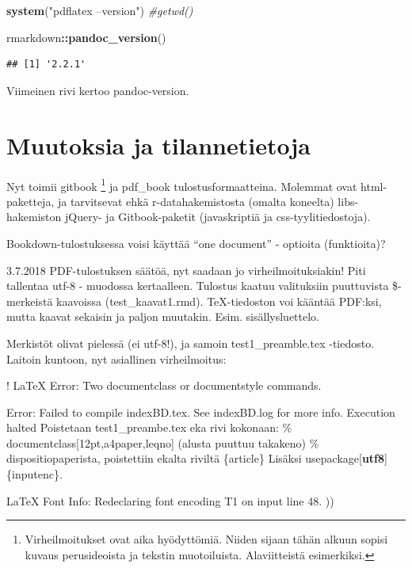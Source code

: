 \documentclass[finnish,]{book}
\newenvironment{Shaded}{\begin{snugshade}}{\end{snugshade}}
\newcommand{\CommentTok}[1]{\textcolor[rgb]{0.56,0.35,0.01}{\textit{#1}}}
\newcommand{\KeywordTok}[1]{\textcolor[rgb]{0.13,0.29,0.53}{\textbf{#1}}}
\newcommand{\NormalTok}[1]{#1}
\newcommand{\OperatorTok}[1]{\textcolor[rgb]{0.81,0.36,0.00}{\textbf{#1}}}
\newcommand{\StringTok}[1]{\textcolor[rgb]{0.31,0.60,0.02}{#1}}
\let\rmarkdownfootnote\footnote%
\def\footnote{\protect\rmarkdownfootnote}
\theoremstyle{definition}
\theoremstyle{definition}
\theoremstyle{definition}
\theoremstyle{remark}
\begin{document}
\begin{Shaded}
\begin{Highlighting}[]
\KeywordTok{system}\NormalTok{(}\StringTok{"pdflatex --version"}\NormalTok{)}
\CommentTok{#getwd()}

\NormalTok{rmarkdown}\OperatorTok{::}\KeywordTok{pandoc_version}\NormalTok{()}
\end{Highlighting}
\end{Shaded}

\begin{verbatim}
## [1] '2.2.1'
\end{verbatim}

Viimeinen rivi kertoo pandoc-version.

\hypertarget{muutoksia-ja-tilannetietoja}{%
\section{Muutoksia ja
tilannetietoja}\label{muutoksia-ja-tilannetietoja}}

Nyt toimii gitbook \footnote{Virheilmoitukset ovat aika hyödyttömiä.
  Niiden sijaan tähän alkuun sopisi kuvaus perusideoista ja tekstin
  muotoiluista. Alaviitteistä esimerkiksi.} ja pdf\_book
tulostusformaatteina. Molemmat ovat html-paketteja, ja tarvitsevat ehkä
r-datahakemistosta (omalta koneelta) libs-hakemiston jQuery- ja
Gitbook-paketit (javaskriptiä ja css-tyylitiedostoja).

Bookdown-tulostuksessa voisi käyttää ``one document'' - optioita
(funktioita)?

3.7.2018 PDF-tulostuksen säätöä, nyt saadaan jo virheilmoituksiakin!
Piti tallentaa utf-8 - muodossa kertaalleen. Tulostus kaatuu valituksiin
puuttuvista \$-merkeistä kaavoissa (test\_kaavat1.rmd). TeX-tiedoston
voi kääntää PDF:ksi, mutta kaavat sekaisin ja paljon muutakin. Esim.
sisällysluettelo.

Merkistöt olivat pielessä (ei utf-8!), ja samoin test1\_preamble.tex
-tiedosto. Laitoin kuntoon, nyt asiallinen virheilmoitus:

! LaTeX Error: Two documentclass or documentstyle commands.

Error: Failed to compile indexBD.tex. See indexBD.log for more info.
Execution halted Poistetaan test1\_preambe.tex eka rivi kokonaan: \%
documentclass{[}12pt,a4paper,leqno{]} (alusta puuttuu takakeno) \%
dispositiopaperista, poistettiin ekalta riviltä \{article\} Lisäksi
usepackage{[}\textbf{utf8}{]}\{inputenc\}.

LaTeX Font Info: Redeclaring font encoding T1 on input line 48. ))
\end{document}
